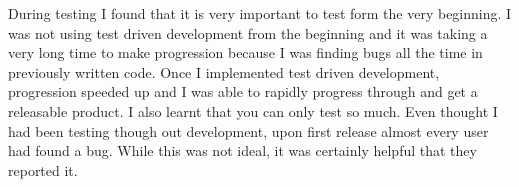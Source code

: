 During testing I found that it is very important to test form the very beginning. I was not using test driven development from the beginning and it was taking a very long time to make progression because I was finding bugs all the time in previously written code. Once I implemented test driven development, progression speeded up and I was able to rapidly progress through and get a releasable product. I also learnt that you can only test so much. Even thought I had been testing though out development, upon first release almost every user had found a bug. While this was not ideal, it was certainly helpful that they reported it.\\